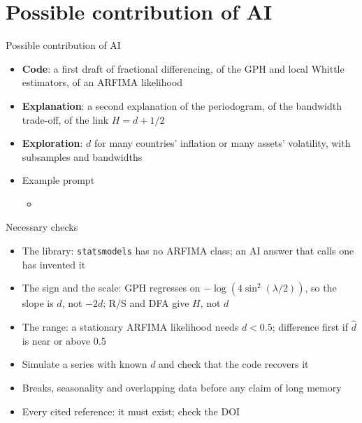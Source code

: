 \section{Possible contribution of AI}

\begin{frame}{Possible contribution of AI}
\itemsize{\small}
\begin{itemize}
    \item \textbf{Code}: a first draft of fractional differencing, of the GPH and local Whittle estimators, of an ARFIMA likelihood
    \item \textbf{Explanation}: a second explanation of the periodogram, of the bandwidth trade-off, of the link $H = d + 1/2$
    \item \textbf{Exploration}: $d$ for many countries' inflation or many assets' volatility, with subsamples and bandwidths
    \item Example prompt
    \begin{itemize}
        \item {}
    \end{itemize}
\end{itemize}
\end{frame}

\begin{frame}{Necessary checks}
\itemsize{\small}
\begin{itemize}
    \item The library: \texttt{statsmodels} has no ARFIMA class; an AI answer that calls one has invented it
    \item The sign and the scale: GPH regresses on $-\log(4\sin^2(\lambda/2))$, so the slope is $d$, not $-2d$; R/S and DFA give $H$, not $d$
    \item The range: a stationary ARFIMA likelihood needs $d < 0.5$; difference first if $\hat d$ is near or above 0.5
    \item Simulate a series with known $d$ and check that the code recovers it
    \item Breaks, seasonality and overlapping data before any claim of long memory
    \item Every cited reference: it must exist; check the DOI
\end{itemize}
\end{frame}


